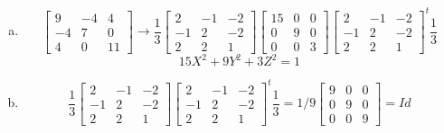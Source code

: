 \documentclass[12pt]{article}
\begin{document}
\section{} %
\begin{enumerate}[(a)]
	\item 
		\[
			\begin{bmatrix}
				9 & -4 & 4\\
				-4 & 7 & 0\\
				4 & 0 & 11
			\end{bmatrix}
				\longrightarrow
				\dfrac{1}{3}
				\begin{bmatrix}
					2 & -1 & -2\\
					-1 & 2 & -2\\
					2 & 2 & 1
				\end{bmatrix}
				\begin{bmatrix}
					15 & 0 & 0\\
					0 & 9 & 0\\
					0 & 0 & 3
				\end{bmatrix}
				\begin{bmatrix}
					2 & -1 & -2\\
					-1 & 2 & -2\\
					2 & 2 & 1
				\end{bmatrix}^t
				\dfrac{1}{3}
		\]
		\[ 15X^2 + 9Y^2 + 3Z^2 = 1 \]
		
	\item 
		\[ \dfrac{1}{3}
			\begin{bmatrix}
				2 & -1 & -2\\
				-1 & 2 & -2\\
				2 & 2 & 1
			\end{bmatrix}
			\begin{bmatrix}
				2 & -1 & -2\\
				-1 & 2 & -2\\
				2 & 2 & 1
			\end{bmatrix}^t
			\dfrac{1}{3} = 
			1/9
			\begin{bmatrix}
				9 & 0 & 0\\
				0 & 9 & 0\\
				0 & 0 & 9
			\end{bmatrix}
			= Id
	 	\]
\end{enumerate}
\newpage
\end{document}
